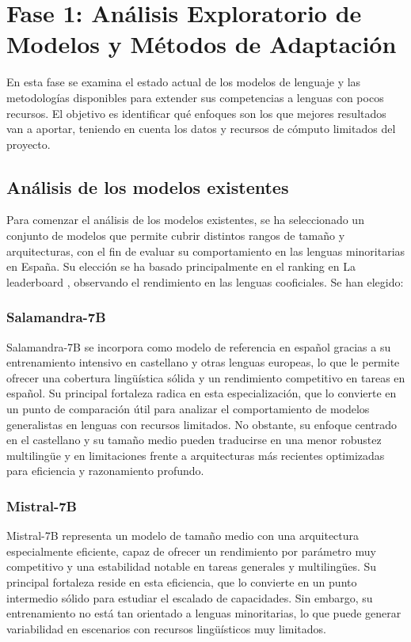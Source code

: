 \chapter{Fase 1: Análisis Exploratorio de Modelos y Métodos de Adaptación}
\label{ch:extraccion}

En esta fase se examina el estado actual de los modelos de lenguaje y las metodologías disponibles para extender sus competencias a lenguas con pocos recursos. El objetivo es identificar qué enfoques son los que mejores resultados van a aportar, teniendo en cuenta los datos y recursos de cómputo limitados del proyecto.

\section{Análisis de los modelos existentes}

Para comenzar el análisis de los modelos existentes, se ha seleccionado un conjunto de modelos que permite cubrir distintos rangos de tamaño y arquitecturas, con el fin de evaluar su comportamiento en las lenguas minoritarias en España. Su elección se ha basado principalmente en el ranking en La leaderboard \cite{grandury2025leaderboard}, observando el rendimiento en las lenguas cooficiales. Se han elegido:

\subsection*{Salamandra-7B}
Salamandra-7B \cite{gonzalezagirre2025salamandratechnicalreport} se incorpora como modelo de referencia en español gracias a su entrenamiento intensivo en castellano y otras lenguas europeas, lo que le permite ofrecer una cobertura lingüística sólida y un rendimiento competitivo en tareas en español. Su principal fortaleza radica en esta especialización, que lo convierte en un punto de comparación útil para analizar el comportamiento de modelos generalistas en lenguas con recursos limitados. No obstante, su enfoque centrado en el castellano y su tamaño medio pueden traducirse en una menor robustez multilingüe y en limitaciones frente a arquitecturas más recientes optimizadas para eficiencia y razonamiento profundo.

\subsection*{Mistral-7B}
Mistral-7B \cite{jiang2023mistral} representa un modelo de tamaño medio con una arquitectura especialmente eficiente, capaz de ofrecer un rendimiento por parámetro muy competitivo y una estabilidad notable en tareas generales y multilingües. Su principal fortaleza reside en esta eficiencia, que lo convierte en un punto intermedio sólido para estudiar el escalado de capacidades. Sin embargo, su entrenamiento no está tan orientado a lenguas minoritarias, lo que puede generar variabilidad en escenarios con recursos lingüísticos muy limitados.

